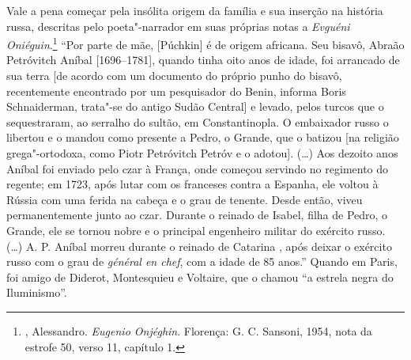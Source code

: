 Vale a pena começar pela insólita origem da família e sua inserção na
história russa, descritas pelo poeta"-narrador em suas próprias notas a
\emph{Evguéni Oniéguin}.\footnote{, Alessandro. \emph{Eugenio Onjéghin}. Florença: G. C. Sansoni, 1954, nota da estrofe 50, verso 11, capítulo 1.} ``Por parte
de mãe, [Púchkin] é de origem africana. Seu bisavô, Abraão
Petróvitch Aníbal [1696--1781], quando tinha oito anos de idade, foi
arrancado de sua terra [de acordo com um documento do próprio punho
do bisavô, recentemente encontrado por um pesquisador do Benin, informa
Boris Schnaiderman, trata"-se do antigo Sudão Central] e levado, pelos turcos que o
sequestraram, ao serralho do sultão, em Constantinopla. O embaixador
russo o libertou e o mandou como presente a Pedro, o Grande, que o batizou [na religião grega"-ortodoxa, como Piotr Petróvitch Petróv e o adotou]. (\ldots{}) Aos dezoito anos Aníbal foi enviado pelo czar à França, onde começou servindo no regimento do
regente; em 1723, após lutar com os franceses contra a Espanha, ele
voltou à Rússia com uma ferida na cabeça e o grau de tenente.
Desde então, viveu permanentemente junto ao czar. Durante o
reinado de Isabel, filha de Pedro, o Grande, ele se tornou nobre e o
principal engenheiro militar do exército russo. (\ldots{}) A. P. Aníbal
morreu durante o reinado de Catarina , após deixar o
exército russo com o grau de \emph{général en chef}, com a idade de 85
anos.'' Quando em Paris, foi amigo de Diderot, Montesquieu e Voltaire,
que o chamou ``a estrela negra do Iluminismo''.

